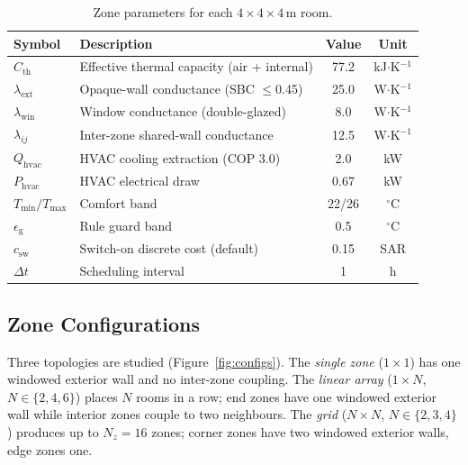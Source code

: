 \documentclass[12pt,a4paper]{article}
\let\oldsubsection\subsection
\renewcommand{\subsection}[1]{\FloatBarrier\oldsubsection{#1}}
\newcommand{\Tmin}{T_{\min}}
\newcommand{\Tmax}{T_{\max}}
\newcommand{\Cth}{C_{\mathrm{th}}}
\newcommand{\lext}{\lambda_{\mathrm{ext}}}
\newcommand{\lwin}{\lambda_{\mathrm{win}}}
\newcommand{\lij}{\lambda_{ij}}
\newcommand{\Qhvac}{Q_{\mathrm{hvac}}}
\newcommand{\csw}{c_{\mathrm{sw}}}
\newcommand{\Phvac}{P_{\mathrm{hvac}}}
\begin{document}
\begin{table}[!t]
\centering
\caption{Zone parameters for each $4\times4\times4\,\text{m}$ room.}
\label{tab:params}
\setlength{\tabcolsep}{4.5pt}
\begin{tabularx}{\linewidth}{lXcc}
\toprule
Symbol & Description & Value & Unit \\
\midrule
$\Cth$   & Effective thermal capacity (air + internal)& 77.2 & kJ$\cdot$K$^{-1}$\\
$\lext$  & Opaque-wall conductance (SBC $\le$0.45)   & 25.0 & W$\cdot$K$^{-1}$ \\
$\lwin$  & Window conductance (double-glazed)         &  8.0 & W$\cdot$K$^{-1}$ \\
$\lij$   & Inter-zone shared-wall conductance         & 12.5 & W$\cdot$K$^{-1}$ \\
$\Qhvac$ & HVAC cooling extraction (COP 3.0)         &  2.0 & kW \\
$\Phvac$ & HVAC electrical draw                       & 0.67 & kW \\
$\Tmin/\Tmax$ & Comfort band                         & 22/26 & $^\circ$C \\
$\epsilon_{\mathrm{g}}$ & Rule guard band             &  0.5 & $^\circ$C \\
$\csw$       & Switch-on discrete cost (default)      & 0.15 & SAR \\
$\Delta t$  & Scheduling interval                     &    1 & h \\
\bottomrule
\end{tabularx}
\end{table}

\subsection{Zone Configurations}
\label{subsec:configs}

Three topologies are studied (Figure~\ref{fig:configs}).
The \emph{single zone} ($1\times1$) has one windowed exterior wall and
no inter-zone coupling.
The \emph{linear array} ($1\times N$, $N\in\{2,4,6\}$) places $N$ rooms
in a row; end zones have one windowed exterior wall while interior zones
couple to two neighbours.
The \emph{grid} ($N\times N$, $N\in\{2,3,4\}$) produces up to
$N_z=16$ zones; corner zones have two windowed exterior walls, edge
zones one.
\end{document}
